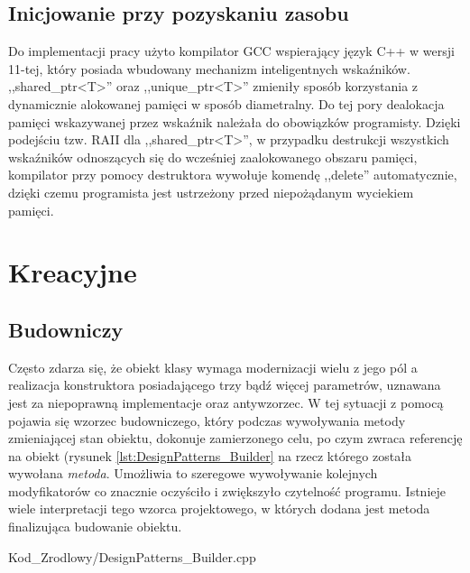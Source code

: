     \subsection{Inicjowanie przy pozyskaniu zasobu}
        Do implementacji pracy użyto kompilator GCC wspierający język C++ w wersji 11-tej, który posiada wbudowany mechanizm inteligentnych wskaźników. ,,shared\_ptr<T>'' oraz ,,unique\_ptr<T>''
        zmieniły sposób korzystania z dynamicznie alokowanej pamięci w sposób diametralny. Do tej pory dealokacja pamięci wskazywanej przez wskaźnik należała do obowiązków programisty.
        Dzięki podejściu tzw. RAII dla ,,shared\_ptr<T>'', w przypadku destrukcji wszystkich wskaźników odnoszących się do wcześniej zaalokowanego obszaru pamięci,
        kompilator przy pomocy destruktora wywołuje komendę ,,delete'' automatycznie, dzięki czemu programista jest ustrzeżony przed niepożądanym wyciekiem pamięci.
\newpage
\section{Kreacyjne}
    \subsection{Budowniczy}
        Często zdarza się, że obiekt klasy wymaga modernizacji wielu z jego pól a realizacja konstruktora posiadającego trzy bądź więcej parametrów,
        uznawana jest za niepoprawną implementacje oraz antywzorzec. W tej sytuacji z pomocą pojawia się wzorzec budowniczego, który podczas wywoływania metody 
        zmieniającej stan obiektu, dokonuje zamierzonego celu, po czym zwraca referencję na obiekt (rysunek \ref{lst:DesignPatterns_Builder} na rzecz którego została wywołana \textit{metoda}. 
        Umożliwia to szeregowe wywoływanie kolejnych modyfikatorów co znacznie oczyściło i zwiększyło czytelność programu. Istnieje wiele interpretacji tego wzorca projektowego,
        w których dodana jest metoda finalizująca budowanie obiektu\cite{gamma2005wzorce}.
        
            {Kod_Zrodlowy/DesignPatterns_Builder.cpp}
\newpage
